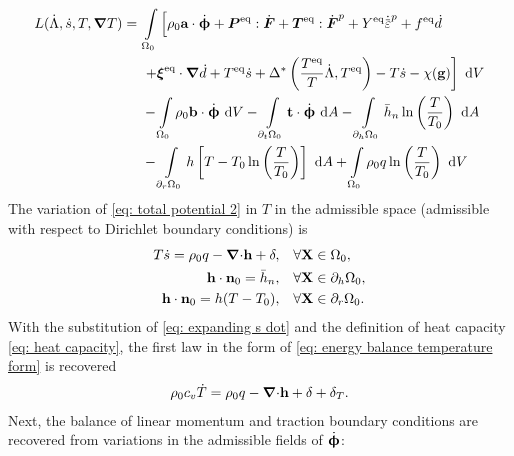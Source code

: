 \begin{equation}
  \begin{aligned}
    L(\dot{\Lambda}, \dot{s}, T, \grad T) = & \ \int\limits_{\body_0} \left[ \rho_0\bta\cdot\defrate + \bfP^\text{eq}:\dot{\defgrad} + \bfT^\text{eq}:\dot{\defgrad}^p + Y^\text{eq}\epdot + f^\text{eq}\dot{d} \right.                                         \\
                                            & \ \left. + \bs{\xi}^\text{eq}\cdot\grad\dot{d} + T^\text{eq}\dot{s} + \Delta^*\left( \dfrac{T^\text{eq}}{T}\dot{\Lambda}, T^\text{eq} \right) - T\dot{s} - \chi(\btg) \right] \diff{V}                            \\
                                            & \ - \int\limits_{\body_0} \rho_0 \btb \cdot \defrate \diff{V} - \int\limits_{\partial_t\body_0} \btt \cdot \defrate \diff{A} - \int\limits_{\partial_h\body_0} \bar{h}_n\ln\left( \dfrac{T}{T_0} \right) \diff{A} \\
                                            & \ - \int\limits_{\partial_r\body_0} h\left[ T - T_0 \ln\left( \dfrac{T}{T_0} \right) \right] \diff{A} + \int\limits_{\body_0} \rho_0 q \ln\left( \dfrac{T}{T_0} \right) \diff{V}                                  
  \end{aligned}\label{eq: total potential 2}
\end{equation}
The variation of \eqref{eq: total potential 2} in $T$ in the admissible space (admissible with respect to Dirichlet boundary conditions) is
\begin{subequations}
  \begin{align}
    T\dot{s} = \rho_0 q - {\boldsymbol{\nabla} \cdot} \textbf{h} + \delta, & \quad \forall \textbf{X} \in \Omega_0,           \\
    \textbf{h} \cdot \textbf{n}_0 = \bar{h}_n,                & \quad \forall \textbf{X} \in \partial_h\Omega_0, \\
    \textbf{h} \cdot \textbf{n}_0 = h(T - T_0),               & \quad \forall \textbf{X} \in \partial_r\Omega_0. 
  \end{align}
\end{subequations}
With the substitution of \eqref{eq: expanding s dot} and the definition of heat capacity \eqref{eq: heat capacity}, the first law in the form of \eqref{eq: energy balance temperature form} is recovered
\begin{align}
  \rho_0 c_v \dot{T} = \rho_0 q - {\boldsymbol{\nabla} \cdot} \textbf{h} + \delta + \delta_T.
\end{align}
Next, the balance of linear momentum and traction boundary conditions are recovered from variations in the admissible fields of $\dot{\boldsymbol{\upphi}}$:
